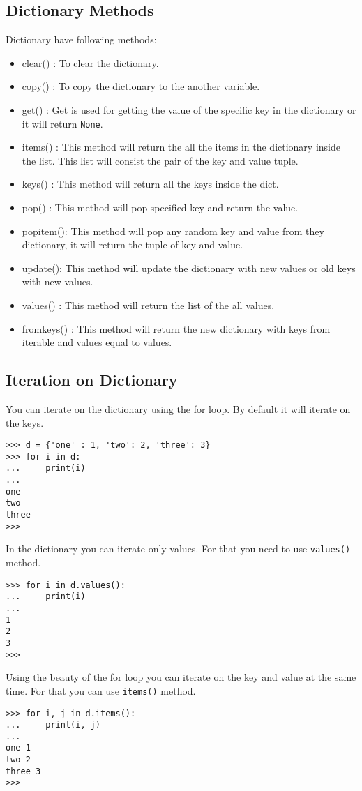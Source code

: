 \documentclass[letterpaper,12pt]{book}
\begin{document}
\subsection{Dictionary Methods}
Dictionary have following methods:
\begin{itemize}
\item clear() : To clear the dictionary.
\item copy() : To copy the dictionary to the another variable.
\item get() : Get is used for getting the value of the specific key in the dictionary or it will return \texttt{None}.
\item items() : This method will return the all the items in the dictionary inside the list. This list will consist the pair of the key and value tuple.
\item keys() : This method will return all the keys inside the dict.
\item pop() : This method will pop specified key and return the value.
\item popitem(): This method will pop any random key and value from they dictionary, it will return the tuple of key and value.
\item update(): This method will update the dictionary with new values or old keys with new values.
\item values() : This method will return the list of the all values.
\item fromkeys() : This method will return the new dictionary with keys from iterable and values equal to values.
\end{itemize}
\subsection{Iteration on Dictionary}
You can iterate on the dictionary using the for loop. By default it will iterate on the keys.
\begin{lstlisting}
>>> d = {'one' : 1, 'two': 2, 'three': 3}
>>> for i in d:
...     print(i)
... 
one
two
three
>>> 
\end{lstlisting}
In the dictionary you can iterate only values. For that you need to use \texttt{values()} method.
\begin{lstlisting}
>>> for i in d.values():
...     print(i)
... 
1
2
3
>>> 
\end{lstlisting}
Using the beauty of the for loop you can iterate on the key and value  at the same time. For that you can use \texttt{items()} method.
\begin{lstlisting}
>>> for i, j in d.items():
...     print(i, j)
... 
one 1
two 2
three 3
>>> 
\end{lstlisting}
\end{document}
